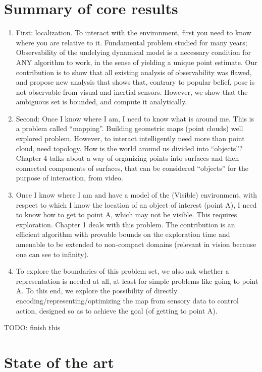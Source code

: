 \documentclass [PhD] {uclathes}
\begin{document}
\begin{enumerate}
\section{Summary of core results}
\begin{enumerate}
\item \label{bullet: slam} First: localization. To interact with the environment, first you need to know where you are relative to it. Fundamental problem studied for many years; Observability of the undelying dynamical model is a necessary condition for ANY algorithm to work, in the sense of yielding a unique point estimate. Our contribution is to show that all existing analysis of observability was flawed, and propose new analysis that shows that, contrary to popular belief, pose is not observable from visual and inertial sensors. However, we show that the ambiguous set is bounded, and compute it analytically.
\item \label{bullet: SO} Second: Once I know where I am, I need to know what is around me. This is a problem called ``mapping''. Building geometric maps (point clouds) well explored problem. However, to interact intelligently need more than point cloud, need topology. How is the world around us divided into ``objects''? Chapter 4 talks about a way of organizing points into surfaces and then connected components of surfaces, that can be considered ``objects'' for the purpose of interaction, from video.
\item \label{bullet: exploration} Once I know where I am and have a model of the (Visible) environment, with respect to which I know the location of an object of interest (point A), I need to know how to get to point A, which may not be visible. This requires exploration. Chapter 1 deals with this problem. The contribution is an efficient algorithm with provable bounds on the exploration time and amenable to be extended to non-compact domains (relevant in vision because one can see to infinity).
\item \label{bullet: rep-redux} To explore the boundaries of this problem set, we also ask whether a representation is needed at all, at least for simple problems like going to point A. To this end, we explore the possibility of directly encoding/representing/optimizing the map from sensory data to control action, designed so as to achieve the goal (of getting to point A).
\end{enumerate}

\iffalse TODO: finish this
\section{State of the art}


\end{enumerate}
\end{document}
